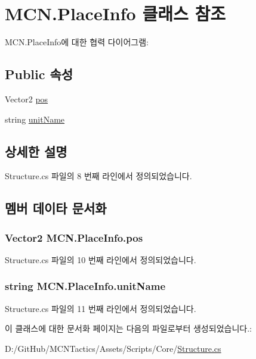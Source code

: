 \hypertarget{class_m_c_n_1_1_place_info}{}\section{M\+C\+N.\+Place\+Info 클래스 참조}
\label{class_m_c_n_1_1_place_info}


M\+C\+N.\+Place\+Info에 대한 협력 다이어그램\+:
\subsection*{Public 속성}
\begin{DoxyCompactItemize}
\item 
Vector2 \hyperlink{class_m_c_n_1_1_place_info_ab61c1f49a0d342fb132a2af87ee7c322}{pos}
\item 
string \hyperlink{class_m_c_n_1_1_place_info_a5949fecaca40a115d37f3ad02b8cc15e}{unit\+Name}
\end{DoxyCompactItemize}


\subsection{상세한 설명}


Structure.\+cs 파일의 8 번째 라인에서 정의되었습니다.



\subsection{멤버 데이타 문서화}
\subsubsection[{\texorpdfstring{pos}{pos}}]{\setlength{\rightskip}{0pt plus 5cm}Vector2 M\+C\+N.\+Place\+Info.\+pos}\hypertarget{class_m_c_n_1_1_place_info_ab61c1f49a0d342fb132a2af87ee7c322}{}\label{class_m_c_n_1_1_place_info_ab61c1f49a0d342fb132a2af87ee7c322}


Structure.\+cs 파일의 10 번째 라인에서 정의되었습니다.

\subsubsection[{\texorpdfstring{unit\+Name}{unitName}}]{\setlength{\rightskip}{0pt plus 5cm}string M\+C\+N.\+Place\+Info.\+unit\+Name}\hypertarget{class_m_c_n_1_1_place_info_a5949fecaca40a115d37f3ad02b8cc15e}{}\label{class_m_c_n_1_1_place_info_a5949fecaca40a115d37f3ad02b8cc15e}


Structure.\+cs 파일의 11 번째 라인에서 정의되었습니다.



이 클래스에 대한 문서화 페이지는 다음의 파일로부터 생성되었습니다.\+:\begin{DoxyCompactItemize}
\item 
D\+:/\+Git\+Hub/\+M\+C\+N\+Tactics/\+Assets/\+Scripts/\+Core/\hyperlink{_structure_8cs}{Structure.\+cs}\end{DoxyCompactItemize}
